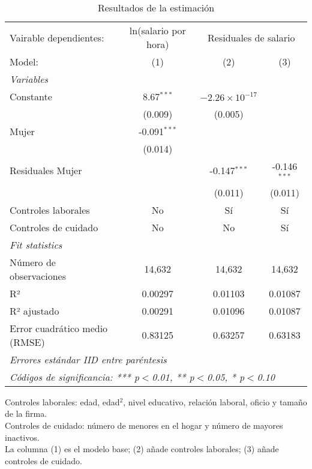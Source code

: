 
\begin{table}[htbp]
   \caption{Resultados de la estimación}
   \centering
   \begin{tabular}{lccc}
      \tabularnewline \midrule \midrule
      Vairable dependientes: & ln(salario por hora) & \multicolumn{2}{c}{Residuales de salario}\\
      Model:                        & (1)            & (2)                     & (3)\\  
      \midrule
      \emph{Variables}\\
      Constante                     & 8.67$^{***}$   & $-2.26\times 10^{-17}$  &   \\   
                                    & (0.009)        & (0.005)                 &   \\   
      Mujer                         & -0.091$^{***}$ &                         &   \\   
                                    & (0.014)        &                         &   \\   
      Residuales Mujer              &                & -0.147$^{***}$          & -0.146$^{***}$\\   
                                    &                & (0.011)                 & (0.011)\\   
      Controles laborales           & No             & Sí                      & Sí\\  
      Controles de cuidado          & No             & No                      & Sí\\  
      \midrule
      \emph{Fit statistics}\\
      Número de observaciones       & 14,632         & 14,632                  & 14,632\\  
      R²                            & 0.00297        & 0.01103                 & 0.01087\\  
      R² ajustado                   & 0.00291        & 0.01096                 & 0.01087\\  
      Error cuadrático medio (RMSE) & 0.83125        & 0.63257                 & 0.63183\\  
      \midrule \midrule
      \multicolumn{4}{l}{\emph{Errores estándar IID entre paréntesis}}\\
      \multicolumn{4}{l}{\emph{Códigos de significancia: *** p$<$0.01, ** p$<$0.05, * p$<$0.10}}\\
   \end{tabular}
   
   \par \raggedright 
   Controles laborales: edad, edad$^2$, nivel educativo, relación laboral, oficio y tamaño de la firma.\\
   Controles de cuidado: número de menores en el hogar y número de mayores inactivos.\\
   La columna (1) es el modelo base; (2) añade controles laborales; (3) añade controles de cuidado.
\end{table}


